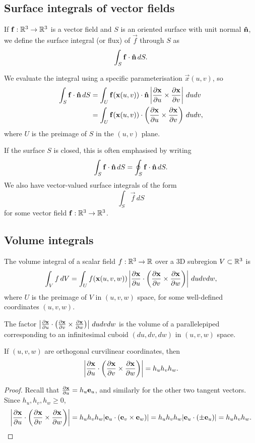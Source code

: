 \documentclass[10pt, a4paper]{article}
\begin{document}
\subsection{Surface integrals of vector fields}
If $\vec{f} : \R ^ 3 \to \R ^ 3$ is a vector field and $S$ is an oriented surface with unit normal $\hvec{n}$,
we define the surface integral
(or flux)
of $\vec{f}$ through $S$ as
\[
\int_{S}\vec{f} \cdot\hvec{n}\,dS.
\]

We evaluate the integral using a specific parameterisation $\vec{x}(u, v)$,
so
\begin{align*}
    \int_{S}\vec{f}\cdot\hvec{n}\,dS &= \int_{U}\vec{f}(\vec{x}(u, v))\cdot\hvec{n}\left|\pd[\vec{x}]{u} \times \pd[\vec{x}]{v}\right|\,dudv \\
    &= \int_{U}\vec{f}(\vec{x}(u, v)) \cdot \left(\pd[\vec{x}]{u} \times \pd[\vec{x}]{v}\right)\,dudv,
\end{align*}
where $U$ is the preimage of $S$ in the $(u, v)$ plane.

If the surface $S$ is closed,
this is often emphasised by writing
\[
\int_{S}\vec{f}\cdot\hvec{n}\,dS = \oint_{S}\vec{f}\cdot\hvec{n}\,dS.
\]
We also have vector-valued surface integrals of the form
\[
\int_{S}\vec{f}\,dS
\]
for some vector field $\vec{f} : \R ^ 3 \to \R ^ 3$.

\subsection{Volume integrals}
The volume integral of a scalar field $f : \R ^ 3 \to \R$ over a $3$D subregion $V \subset \R ^ 3$ is
\[
\int_{V}f\,dV = \int_{U}f(\vec{x}(u, v, w))\left|\pd[\vec{x}]{u} \cdot \left(\pd[\vec{x}]{v} \times \pd[\vec{x}]{w}\right)\right|\,dudvdw,
\]
where $U$ is the preimage of $V$ in $(u, v, w)$ space,
for some well-defined coordinates $(u, v, w)$.

The factor $\left|\pd[\vec{x}]{u} \cdot \left(\pd[\vec{x}]{v} \times \pd[\vec{x}]{w}\right)\right|\,dudvdw$ is the volume of a parallelepiped corresponding to an infinitesimal cuboid $(du, dv, dw)$ in $(u, v, w)$ space.

\begin{proposition}
    If $(u, v, w)$ are orthogonal curvilinear coordinates,
    then
    \[
    \left|\pd[\vec{x}]{u} \cdot \left(\pd[\vec{x}]{v} \times \pd[\vec{x}]{w}\right)\right| = h_uh_vh_w.
    \]

    \begin{proof}
        Recall that $\pd[\vec{x}]{u} = h_u\vec{e}_u$,
        and similarly for the other two tangent vectors.
        Since $h_u, h_v, h_w \geq 0$,
        \[
        \left|\pd[\vec{x}]{u} \cdot \left(\pd[\vec{x}]{v} \times \pd[\vec{x}]{w}\right)\right| = h_uh_vh_w|\vec{e}_u \cdot (\vec{e}_v \times \vec{e}_w)| = h_uh_vh_w|\vec{e}_u \cdot (\pm\vec{e}_u)| = h_uh_vh_w.
        \]
    \end{proof}
\end{proposition}
\end{document}

